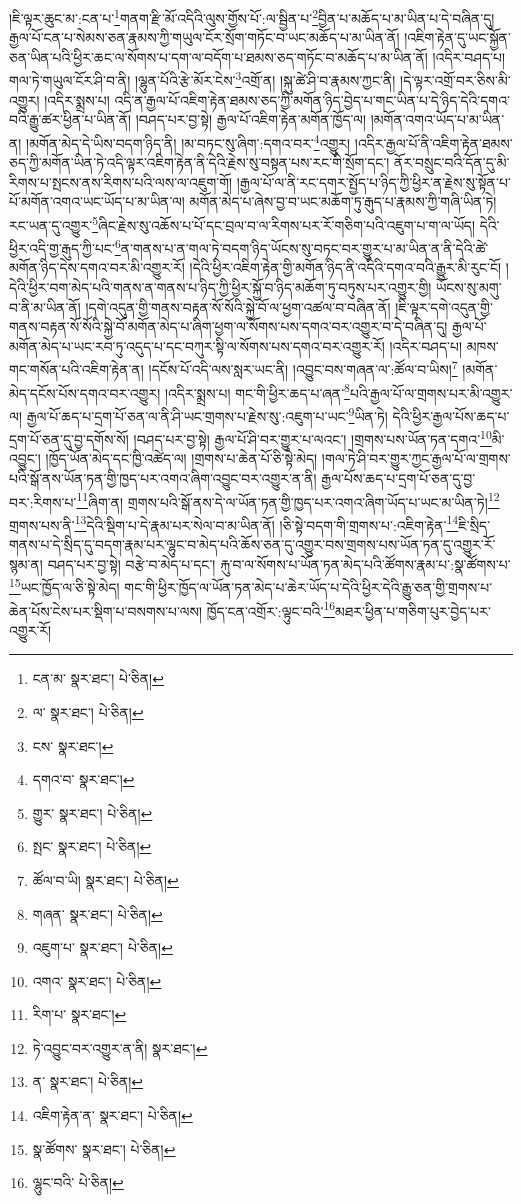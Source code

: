 །ཇི་ལྟར་ཆུང་མ་:ངན་པ་\footnote{ངན་མ་  སྣར་ཐང་།  པེ་ཅིན། }གནག་རྫི་མོ་འདིའི་ལུས་གྱོས་པོ་:ལ་སྦྱིན་པ་\footnote{ལ་  སྣར་ཐང་།  པེ་ཅིན། }བྱིན་པ་མཆོད་པ་མ་ཡིན་པ་དེ་བཞིན་དུ། རྒྱལ་པོ་ངན་པ་སེམས་ཅན་རྣམས་ཀྱི་གཡུལ་ངོར་སྲོག་གཏོང་བ་ཡང་མཆོད་པ་མ་ཡིན་ནོ། །འཇིག་རྟེན་དུ་ཡང་སྐྱོན་ཅན་ཡིན་པའི་ཕྱིར་ཆང་ལ་སོགས་པ་དག་ལ་བདོག་པ་ཐམས་ཅད་གཏོང་བ་མཆོད་པ་མ་ཡིན་ནོ། །འདིར་བཤད་པ། གལ་ཏེ་གཡུལ་ངོར་ཤི་བ་ནི། །ལྷུན་པོའི་རྩེ་མོར་ངེས་\footnote{ངས་  སྣར་ཐང་། }འགྲོ་ན། །སྐུ་ཚེ་ཤི་བ་རྣམས་ཀྱང་ནི། །དེ་ལྟར་འགྲོ་བར་ཅིས་མི་འགྱུར། །འདིར་སྨྲས་པ། འདི་ན་རྒྱལ་པོ་འཇིག་རྟེན་ཐམས་ཅད་ཀྱི་མགོན་ཉིད་བྱེད་པ་གང་ཡིན་པ་དེ་ཉིད་དེའི་དགའ་བའི་རྒྱུ་ཚར་ཕྱིན་པ་ཡིན་ནོ། །བཤད་པར་བྱ་སྟེ། རྒྱལ་པོ་འཇིག་རྟེན་མགོན་ཁྱོད་ལ། །མགོན་འགའ་ཡོད་པ་མ་ཡིན་ན། །མགོན་མེད་དེ་ཡིས་བདག་ཉིད་ནི། །མ་བཏང་སུ་ཞིག་:དགའ་བར་\footnote{དགའ་བ་  སྣར་ཐང་། }འགྱུར། །འདིར་རྒྱལ་པོ་ནི་འཇིག་རྟེན་ཐམས་ཅད་ཀྱི་མགོན་ཡིན་ཏེ་འདི་ལྟར་འཇིག་རྟེན་ནི་དེའི་རྗེས་སུ་བསྟན་པས་རང་གི་སྲོག་དང་། ནོར་བསྲུང་བའི་དོན་དུ་མི་རིགས་པ་སྤངས་ནས་རིགས་པའི་ལས་ལ་འཇུག་གོ། །རྒྱལ་པོ་ལ་ནི་རང་དགར་སྤྱོད་པ་ཉིད་ཀྱི་ཕྱིར་ན་རྗེས་སུ་སྟོན་པ་པོ་མགོན་འགའ་ཡང་ཡོད་པ་མ་ཡིན་ལ། མགོན་མེད་པ་ཞེས་བྱ་བ་ཡང་མཆོག་ཏུ་རྒུད་པ་རྣམས་ཀྱི་གཞི་ཡིན་ཏེ། རང་ཡན་དུ་འགྱུར་\footnote{གྱུར་  སྣར་ཐང་།  པེ་ཅིན། }ཞིང་རྗེས་སུ་འཆོས་པ་པོ་དང་བྲལ་བ་ལ་རིགས་པར་རོ་གཅིག་པའི་འཇུག་པ་ག་ལ་ཡོད། དེའི་ཕྱིར་འདི་གྱ་རྒུད་ཀྱི་པང་\footnote{སྤང་  སྣར་ཐང་།  པེ་ཅིན། }ན་གནས་པ་ན་གལ་ཏེ་བདག་ཉིད་ཡོངས་སུ་བཏང་བར་གྱུར་པ་མ་ཡིན་ན་ནི་དེའི་ཚེ་མགོན་ཉིད་དེས་དགའ་བར་མི་འགྱུར་རོ། །དེའི་ཕྱིར་འཇིག་རྟེན་གྱི་མགོན་ཉིད་ནི་འདིའི་དགའ་བའི་རྒྱུར་མི་རུང་ངོ། །དེའི་ཕྱིར་བག་མེད་པའི་གནས་ན་གནས་པ་ཉིད་ཀྱི་ཕྱིར་སྐྱོ་བ་ཉིད་མཆོག་ཏུ་བཏུས་པར་འགྱུར་གྱི། ཡོངས་སུ་མགུ་བ་ནི་མ་ཡིན་ནོ། །དགེ་འདུན་གྱི་གནས་བརྟན་སོ་སོའི་སྐྱེ་བོ་ལ་ཕྱག་འཚལ་བ་བཞིན་ནོ། །ཇི་ལྟར་དགེ་འདུན་གྱི་གནས་བརྟན་སོ་སོའི་སྐྱེ་བོ་མགོན་མེད་པ་ཞིག་ཕྱག་ལ་སོགས་པས་དགའ་བར་འགྱུར་བ་དེ་བཞིན་དུ། རྒྱལ་པོ་མགོན་མེད་པ་ཡང་རབ་ཏུ་འདུད་པ་དང་བཀུར་སྟི་ལ་སོགས་པས་དགའ་བར་འགྱུར་རོ། །འདིར་བཤད་པ། མཁས་གང་གསོན་པའི་འཇིག་རྟེན་ན། །དངོས་པོ་འདི་ལས་སླར་ཡང་ནི། །འབྱུང་བས་གཞན་ལ་:ཚོལ་བ་ཡིས།\footnote{ཚོལ་བ་ཡི།  སྣར་ཐང་།  པེ་ཅིན། } །མགོན་མེད་དངོས་པོས་དགའ་བར་འགྱུར། །འདིར་སྨྲས་པ། གང་གི་ཕྱིར་ཆད་པ་ཞན་\footnote{གཞན་  སྣར་ཐང་།  པེ་ཅིན། }པའི་རྒྱལ་པོ་ལ་གྲགས་པར་མི་འགྱུར་ལ། རྒྱལ་པོ་ཆད་པ་དྲག་པོ་ཅན་ལ་ནི་ཤི་ཡང་གྲགས་པ་རྗེས་སུ་:འཇུག་པ་ཡང་\footnote{འཇུག་པ་  སྣར་ཐང་།  པེ་ཅིན། }ཡིན་ཏེ། དེའི་ཕྱིར་རྒྱལ་པོས་ཆད་པ་དྲག་པོ་ཅན་དུ་བྱ་དགོས་སོ། །བཤད་པར་བྱ་སྟེ། རྒྱལ་པོ་ཤི་བར་གྱུར་པ་ལའང་། །གྲགས་པས་ཡོན་ཏན་དགའ་\footnote{འགའ་  སྣར་ཐང་།  པེ་ཅིན། }མི་འབྱུང་། །ཁྱོད་ཡོན་མེད་དང་ཁྱི་འཚེད་ལ། །གྲགས་པ་ཆེན་པོ་ཅི་སྟེ་མེད། །གལ་ཏེ་ཤི་བར་གྱུར་ཀྱང་རྒྱལ་པོ་ལ་གྲགས་པའི་སྒོ་ནས་ཡོན་ཏན་གྱི་ཁྱད་པར་འགའ་ཞིག་འབྱུང་བར་འགྱུར་ན་ནི། རྒྱལ་པོས་ཆད་པ་དྲག་པོ་ཅན་དུ་བྱ་བར་:རིགས་པ་\footnote{རིག་པ་  སྣར་ཐང་། }ཞིག་ན། གྲགས་པའི་སྒོ་ནས་དེ་ལ་ཡོན་ཏན་གྱི་ཁྱད་པར་འགའ་ཞིག་ཡོད་པ་ཡང་མ་ཡིན་ཏེ།\footnote{ཏེ་འབྱུང་བར་འགྱུར་ན་ནི།  སྣར་ཐང་། } གྲགས་པས་ནི་\footnote{ན་  སྣར་ཐང་།  པེ་ཅིན། }དེའི་སྡིག་པ་དེ་རྣམ་པར་སེལ་བ་མ་ཡིན་ནོ། །ཅི་སྟེ་བདག་གི་གྲགས་པ་:འཇིག་རྟེན་\footnote{འཇིག་རྟེན་ན་  སྣར་ཐང་།  པེ་ཅིན། }ཇི་སྲིད་གནས་པ་དེ་སྲིད་དུ་བདག་རྣམ་པར་ལྷུང་བ་མེད་པའི་ཆོས་ཅན་དུ་འགྱུར་བས་གྲགས་པས་ཡོན་ཏན་དུ་འགྱུར་རོ་སྙམ་ན། བཤད་པར་བྱ་སྟེ། བརྩེ་བ་མེད་པ་དང་། རྐུ་བ་ལ་སོགས་པ་ཡོན་ཏན་མེད་པའི་ཚོགས་རྣམ་པ་:སྣ་ཚོགས་པ་\footnote{སྣ་ཚོགས་  སྣར་ཐང་།  པེ་ཅིན། }ཡང་ཁྱོད་ལ་ཅི་སྟེ་མེད། གང་གི་ཕྱིར་ཁྱོད་ལ་ཡོན་ཏན་མེད་པ་ཆེར་ཡོད་པ་དེའི་ཕྱིར་དེའི་རྒྱུ་ཅན་གྱི་གྲགས་པ་ཆེན་པོས་ངེས་པར་སྡིག་པ་བསགས་པ་ལས། ཁྱོད་ངན་འགྲོར་:ལྟུང་བའི་\footnote{ལྷུང་བའི་  པེ་ཅིན། }མཐར་ཕྱིན་པ་གཅིག་པུར་བྱེད་པར་འགྱུར་རོ། 